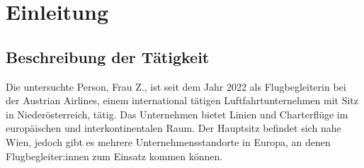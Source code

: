 \documentclass[12pt, a4paper]{article}
\begin{document}
\begin{comment}
    \begin{titlepage}
    \begin{center}
        \large SS2025S 200049-1 Arbeits- und Organisationspsychologie \\
        \vspace{1in}
        \Large Tätigkeitsanalyse \\
        \LARGE Anforderungen und Ressourcen:
        Handlungsempfehlungen zur Verbesserung der
        Arbeitssituation \\
        \vspace*{1in}
        \large 
        Yannick Stöcklin, 12136314 \\
        Lena Freise, 01447889 \\
        Julia Lehner, 12041326 \\
        Felix Sammer, 11936238 \\
        \vfill
        Lehrveranstaltungsleitung: \\
        Univ.-Prof. Mag. Dr. Roman Prem \\
        Dr. Arabella Mühl \\
        \vspace{1in}   
    \end{center}
\end{titlepage}
\end{comment}


\tableofcontents

\newpage

\section{Einleitung}

\subsection{Beschreibung der Tätigkeit}

Die untersuchte Person, Frau Z., ist seit dem Jahr 2022 als Flugbegleiterin bei der Austrian Airlines, 
einem international tätigen Luftfahrtunternehmen mit Sitz in Niederösterreich, 
tätig. Das Unternehmen bietet Linien und Charterflüge im europäischen und interkontinentalen Raum. 
Der Hauptsitz befindet sich nahe Wien, jedoch gibt es mehrere Unternehmensstandorte in Europa, 
an denen Flugbegleiter:innen zum Einsatz kommen können.
\end{document}
